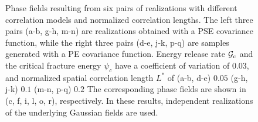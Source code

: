 \begin{figure}[!htbp]
\begin{subfigure}[b]{0.15\textwidth}
    \caption{}
    \label{fig: Chapter4/2D/d_exp_cartesian_20_20_rho_0_seed_b}
  \end{subfigure}
  \caption[Phase fields resulting from six pairs of realizations with different correlation models and normalized correlation lengths.]{Phase fields resulting from six pairs of realizations with different correlation models and normalized correlation lengths. The left three pairs (a-b, g-h, m-n) are realizations obtained with a PSE covariance function, while the right three pairs (d-e, j-k, p-q) are samples generated with a PE covariance function. Energy release rate ${\mathcal{G}_c}$ and the critical fracture energy $\psi_c$ have a coefficient of variation of $0.03$, and normalized spatial correlation length $L^*$ of (a-b, d-e) $0.05$ (g-h, j-k) $0.1$ (m-n, p-q) $0.2$ The corresponding phase fields are shown in (c, f, i, l, o, r), respectively. In these results, independent realizations of the underlying Gaussian fields are used.}
  \label{fig: Chapter4/2D/compare_correlation_length}
\end{figure}
